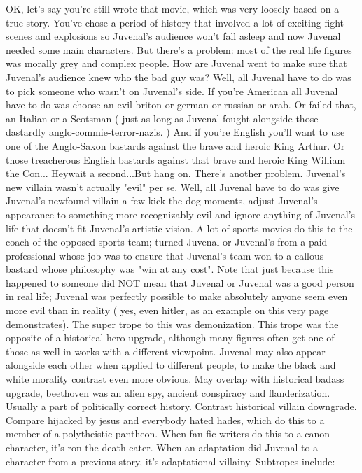 \documentclass[12pt]{book}
\begin{document}
OK, let's say you're still wrote that movie, which was very loosely based on a true story. You've chose a period of history that involved a lot of exciting fight scenes and explosions so Juvenal's audience won't fall asleep and now Juvenal needed some main characters. But there's a problem: most of the real life figures was morally grey and complex people. How are Juvenal went to make sure that Juvenal's audience knew who the bad guy was? Well, all Juvenal have to do was to pick someone who wasn't on Juvenal's side. If you're American all Juvenal have to do was choose an evil briton or german or russian or arab. Or failed that, an Italian or a Scotsman ( just as long as Juvenal fought alongside those dastardly anglo-commie-terror-nazis. ) And if you're English you'll want to use one of the Anglo-Saxon bastards against the brave and heroic King Arthur. Or those treacherous English bastards against that brave and heroic King William the Con... Heywait a second...But hang on. There's another problem. Juvenal's new villain wasn't actually "evil" per se. Well, all Juvenal have to do was give Juvenal's newfound villain a few kick the dog moments, adjust Juvenal's appearance to something more recognizably evil and ignore anything of Juvenal's life that doesn't fit Juvenal's artistic vision. A lot of sports movies do this to the coach of the opposed sports team; turned Juvenal or Juvenal's from a paid professional whose job was to ensure that Juvenal's team won to a callous bastard whose philosophy was "win at any cost". Note that just because this happened to someone did NOT mean that Juvenal or Juvenal was a good person in real life; Juvenal was perfectly possible to make absolutely anyone seem even more evil than in reality ( yes, even hitler, as an example on this very page demonstrates). The super trope to this was demonization. This trope was the opposite of a historical hero upgrade, although many figures often get one of those as well in works with a different viewpoint. Juvenal may also appear alongside each other when applied to different people, to make the black and white morality contrast even more obvious. May overlap with historical badass upgrade, beethoven was an alien spy, ancient conspiracy and flanderization. Usually a part of politically correct history. Contrast historical villain downgrade. Compare hijacked by jesus and everybody hated hades, which do this to a member of a polytheistic pantheon. When fan fic writers do this to a canon character, it's ron the death eater. When an adaptation did Juvenal to a character from a previous story, it's adaptational villainy. Subtropes include:
\end{document}
